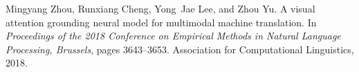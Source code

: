 \documentclass{article}
\begin{document}
\begin{thebibliography}{}
Mingyang Zhou, Runxiang Cheng, Yong~Jae Lee, and Zhou Yu.
\newblock A visual attention grounding neural model for multimodal machine
  translation.
\newblock In {\em Proceedings of the 2018 Conference on Empirical Methods in
  Natural Language Processing, Brussels}, pages 3643--3653. Association for
  Computational Linguistics, 2018.

\end{thebibliography}
 

\end{document}
